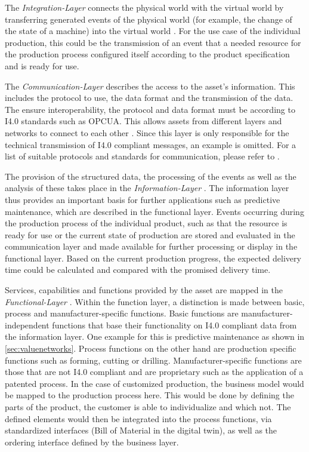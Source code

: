 The \textit{Integration-Layer} connects the physical world with the virtual world by transferring generated events of the physical world (for example, the change of the state of a machine) into the virtual world \cite[p. 46]{Heidel2017ReferenzarchitekturmodellIndustrie4.0Komponente}. For the use case of the individual production, this could be the transmission of an event that a needed resource for the production process configured itself according to the product specification and is ready for use.  
    
The \textit{Communication-Layer} describes the access to the asset's information. This includes the protocol to use, the data format and the transmission of the data. The ensure interoperability, the protocol and data format must be according to \ac{I4.0} standards such as \ac{OPCUA}. This allows assets from different layers and networks to connect to each other \cite[p. 47]{Heidel2017ReferenzarchitekturmodellIndustrie4.0Komponente}. Since this layer is only responsible for the technical transmission of \ac{I4.0} compliant messages, an example is omitted. For a list of suitable protocols and standards for communication, please refer to \citet[p. 49]{Heidel2017ReferenzarchitekturmodellIndustrie4.0Komponente}.  
    
The provision of the structured data, the processing of the events as well as the analysis of these takes place in the \textit{Information-Layer} \cite[p. 51]{Heidel2017ReferenzarchitekturmodellIndustrie4.0Komponente}. The information layer thus provides an important basis for further applications such as predictive maintenance, which are described in the functional layer. Events occurring during the production process of the individual product, such as that the resource is ready for use or the current state of production are stored and evaluated in the communication layer and made available for further processing or display in the functional layer. Based on the current production progress, the expected delivery time could be calculated and compared with the promised delivery time.
    
Services, capabilities and functions provided by the asset are mapped in the \textit{Functional-Layer} \cite[p. 51]{Heidel2017ReferenzarchitekturmodellIndustrie4.0Komponente}. Within the function layer, a distinction is made between basic, process and manufacturer-specific functions. Basic functions are manufacturer-independent functions that base their functionality on \ac{I4.0} compliant data from the information layer. One example for this is predictive maintenance as shown in \ref{sec:valuenetworks}. Process functions on the other hand are production specific functions such as forming, cutting or drilling. Manufacturer-specific functions are those that are not \ac{I4.0} compliant and are proprietary such as the application of a patented process. In the case of customized production, the business model would be mapped to the production process here. This would be done by defining the parts of the product, the customer is able to individualize and which not. The defined elements would then be integrated into the process functions, via standardized interfaces (Bill of Material in the digital twin), as well as the ordering interface defined by the business layer.  
    

